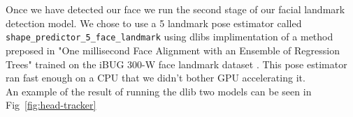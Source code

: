 Once we have detected our face we run the second stage of our facial landmark detection model. We chose to use a 5 landmark pose estimator called \texttt{ shape\_predictor\_5\_face\_landmark} using dlibs implimentation of a method preposed in "One millisecond Face Alignment with an Ensemble of Regression Trees"  trained on the iBUG 300-W face landmark dataset \tocite. This pose estimator ran fast enough on a CPU that we didn't bother GPU accelerating it. \\

An example of the result of running the dlib two models can be seen in Fig~\ref{fig:head-tracker} \\
\begin{invisBox}  
	\hfill
\end{invisBox}

